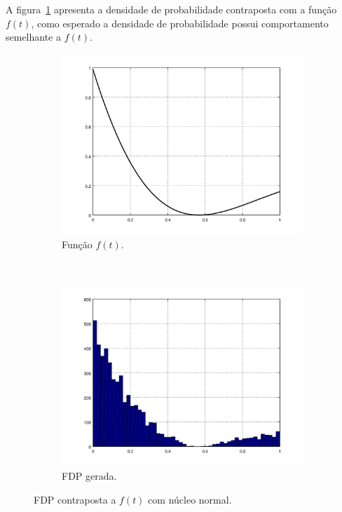 \documentclass [a4paper,10pt]{article}
\begin{document}
    A figura~\ref{normal} apresenta a densidade de probabilidade contraposta com a função $f(t)$, como
    esperado a densidade de probabilidade possui comportamento semelhante a $f(t)$.
      \begin{figure}[!ht]
		\centering
		\begin{subfigure}[!hb]{0.5\textwidth}
		  \centering
		  \includegraphics[width=\textwidth]{graph.png}
		  \caption{Função $f(t)$.}
		\end{subfigure}%
		~
		\begin{subfigure}[!hb]{0.5\textwidth}
		  \centering
		  \includegraphics[width=\textwidth]{normal.png}
		  \caption{FDP gerada.}
		\end{subfigure}
		\caption{FDP contraposta a $f(t)$ com núcleo normal.\label{normal}}
	  \end{figure}
	  
\end{document}
